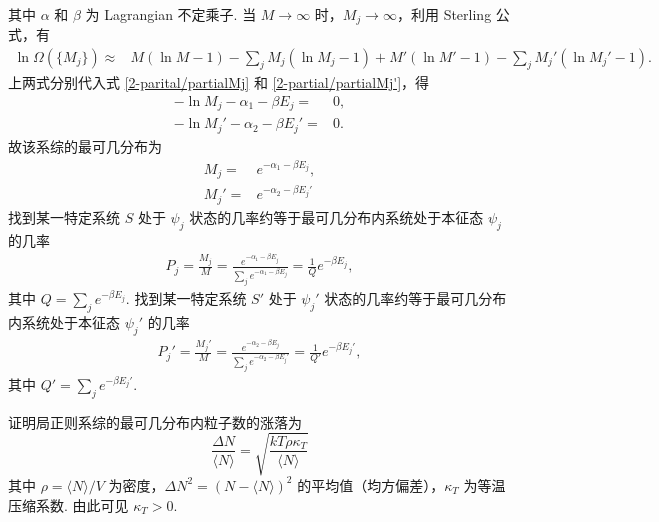 \documentclass{assignment}
\begin{document}
\begin{pf}
\begin{align}
    \end{align}
    其中 $\alpha$ 和 $\beta$ 为 Lagrangian 不定乘子.
    当 $M\rightarrow\infty$ 时，$M_j\rightarrow\infty$，利用 Sterling 公式，有
    \begin{align}
        \ln\Omega(\{M_j\})\approx&M(\ln M-1)-\sum_jM_j(\ln M_j-1)+M'(\ln M'-1)-\sum_jM_j'(\ln M_j'-1).
    \end{align}
    上两式分别代入式 \eqref{2-parital/partialMj} 和 \eqref{2-partial/partialMj'}，得
    \begin{align}
        -\ln M_j-\alpha_1-\beta E_j=&0,\\
        -\ln M_j'-\alpha_2-\beta E_j'=&0.
    \end{align}
    故该系综的最可几分布为
    \begin{align}
        M_j=&e^{-\alpha_1-\beta E_j},\\
        M_j'=&e^{-\alpha_2-\beta E_j'}
    \end{align}
    找到某一特定系统 $S$ 处于 $\psi_j$ 状态的几率约等于最可几分布内系统处于本征态 $\psi_j$ 的几率
    \begin{align}
        P_j=\frac{M_j}{M}=\frac{e^{-\alpha_1-\beta E_j}}{\sum_je^{-\alpha_1-\beta E_j}}=\frac{1}{Q}e^{-\beta E_j},
    \end{align}
    其中 $Q=\sum_je^{-\beta E_j}$.
    找到某一特定系统 $S'$ 处于 $\psi_j'$ 状态的几率约等于最可几分布内系统处于本征态 $\psi_j'$ 的几率
    \begin{align}
        P_j'=\frac{M_j'}{M}=\frac{e^{-\alpha_2-\beta E_j}}{\sum_je^{-\alpha_2-\beta E_j'}}=\frac{1}{Q'}e^{-\beta E_j'},
    \end{align}
    其中 $Q'=\sum_je^{-\beta E_j'}$.
\end{pf}

\begin{prob}
    证明局正则系综的最可几分布内粒子数的涨落为
    \[
        \frac{\Delta N}{\langle N\rangle}=\sqrt{\frac{kT\rho\kappa_T}{\langle N\rangle}}
    \]
    其中 $\rho=\langle N\rangle/V$ 为密度，$\Delta N^2=(N-\langle N\rangle)^2$ 的平均值（均方偏差），$\kappa_T$ 为等温压缩系数. 由此可见 $\kappa_T>0$.
\end{prob}
\begin{pf}
    
\end{pf}
\end{document}
